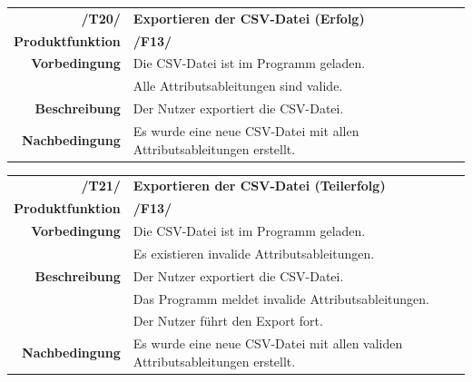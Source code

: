 \documentclass{article}
\begin{document}
\begin{table}[H]
\begin{tabularx}{\textwidth}{rX}
 \vspace{1mm}
\textbf{/T20/}         & \textbf{Exportieren der CSV-Datei (Erfolg)} \\ \vspace{1mm}
\textbf{Produktfunktion} & \textbf{/F13/} \\
\textbf{Vorbedingung}  & Die CSV-Datei ist im Programm geladen. \\ \vspace{1mm} & Alle Attributsableitungen sind valide. \\ \vspace{1mm}
\textbf{Beschreibung}  & Der Nutzer exportiert die CSV-Datei. \\
\textbf{Nachbedingung} & Es wurde eine neue CSV-Datei mit allen Attributsableitungen erstellt.
\end{tabularx}
\end{table}

\begin{table}[H]
\begin{tabularx}{\textwidth}{rX}
 \vspace{1mm}
\textbf{/T21/}         & \textbf{Exportieren der CSV-Datei (Teilerfolg)} \\ \vspace{1mm}
\textbf{Produktfunktion} & \textbf{/F13/} \\
\textbf{Vorbedingung}  & Die CSV-Datei ist im Programm geladen. \\ \vspace{1mm} & Es existieren invalide Attributsableitungen. \\
\textbf{Beschreibung}  & Der Nutzer exportiert die CSV-Datei. \\ & Das Programm meldet invalide Attributsableitungen. \\ \vspace{1mm} & Der Nutzer führt den Export fort. \\
\textbf{Nachbedingung} & Es wurde eine neue CSV-Datei mit allen validen Attributsableitungen erstellt.
\end{tabularx}
\end{table}
\end{document}
